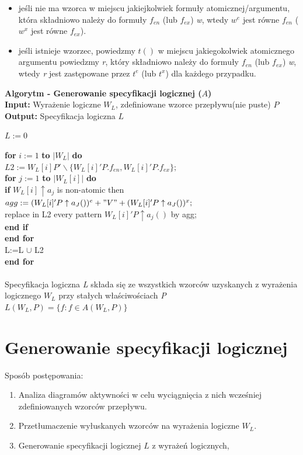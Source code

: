 \documentclass[a4paper, 11pt]{article}
\newcommand\tab[1][1cm]{\hspace*{#1}}
\begin{document}
	\begin{itemize}
		\item jeśli nie ma wzorca w miejscu jakiejkolwiek formuły atomicznej/argumentu, która składniowo należy do formuły $f_{en}$ (lub $f_{ex}$) \textit{w}, wtedy $w^e$ jest równe $f_{en}$ ($w^x$ jest równe $f_{ex}$).
		\item jeśli istnieje wzorzec, powiedzmy $t()$ w miejscu jakiegokolwiek atomicznego argumentu powiedzmy \textit{r}, który składniowo należy do formuły $f_{en}$ (lub $f_{ex}$) \textit{w}, wtedy \textit{r} jest zastępowane przez $t^e$ (lub $t^x$) dla każdego przypadku.
	\end{itemize}
	\textbf{Algorytm - Generowanie specyfikacji logicznej ($A$)}\\
	\textbf{Input:} Wyrażenie logiczne $W_L$, zdefiniowane wzorce przepływu(nie puste) $P$\\
	\textbf{Output:} Specyfikacja logiczna $L$
	
	$L:=0$
	
	\textbf{for} $i:=1$ \textbf{to} $|W_L|$ \textbf{do}\\
	\tab $L2:=W_L[i]P'\backslash \{W_L[i]'P.f_{en},W_L[i]'P.f_{ex}\};$\\	
	\tab \textbf{for} $j:=1$ \textbf{to} $|W_L[i]|$ \textbf{do}\\
	\tab \tab \textbf{if} $W_L[i] \uparrow a_j$ is non-atomic then \\
	\tab \tab \tab	$agg:=(W_L[i]'P\uparrow a_J())^e+"V"+(W_L[i]'P\uparrow a_J())^x;$\\
	\tab \tab \tab	replace in L2 every pattern $W_L[i]'P\uparrow a_j()$ by agg;\\
	\tab \tab	\textbf{end if}\\
	\tab  \textbf{end for}\\
	\tab  L:=L $\cup$ L2 \\
	\tab[0.5cm]\textbf{end for}
	\\
	\\
	Specyfikacja logiczna \textit{L} składa się ze wszystkich wzorców uzyskanych z wyrażenia logicznego $W_L$ przy stałych właściwościach \textit{P} 
	\\
	$L(W_L,P)=\{f:f\in A(W_L,P)\}$
	


	\section{Generowanie specyfikacji logicznej}
	\noindent Sposób postępowania:
	\begin{enumerate}
	\item Analiza diagramów aktywności w celu wyciągnięcia z nich wcześniej zdefiniowanych wzorców przepływu.
	\item Przetłumaczenie wyłuskanych wzorców na wyrażenia logiczne $ W_L$.
	\item Generowanie specyfikacji logicznej $L$ z wyrażeń logicznych, %
	\end{enumerate}
	
\end{document}
